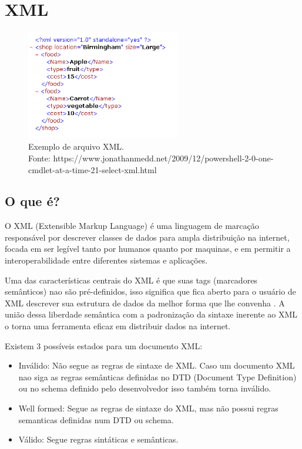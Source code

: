 \section{XML}

\begin{figure}[h]
    \centering
    \includegraphics[width=0.6\textwidth]{imagens/ExampleXML.png}
    \caption{Exemplo de arquivo XML. \\Fonte: https://www.jonathanmedd.net/2009/12/powershell-2-0-one-cmdlet-at-a-time-21-select-xml.html}
    \label{fig:xml_example}
\end{figure}

\subsection{O que é?}

O XML (Extensible Markup Language) é uma linguagem de marcação responsável por descrever classes de dados para ampla distribuição na internet, focada em ser legível tanto por humanos quanto por maquinas, e em permitir a interoperabilidade entre diferentes sistemas e aplicações\cite{bray2000xml}.

Uma das características centrais do XML é que suas tags (marcadores semânticos) nao são pré-definidos, isso significa que fica aberto para o usuário de XML descrever sua estrutura de dados da melhor forma que lhe convenha \cite{mozillaxml}. A união dessa liberdade semântica com a padronização da sintaxe inerente ao XML o torna uma ferramenta eficaz em distribuir dados na internet.

Existem 3 possíveis estados para um documento XML\cite{ibmxml}:
\begin{itemize}
  \item Inválido: Não segue as regras de sintaxe de XML. Caso um documento XML nao siga as regras semânticas definidas no DTD (Document Type Definition) ou no schema definido pelo desenvolvedor isso também torna inválido.
  \item Well formed: Segue as regras de sintaxe do XML, mas não possui regras semanticas definidas num DTD ou schema.
  \item Válido: Segue regras sintáticas e semânticas.
\end{itemize}

